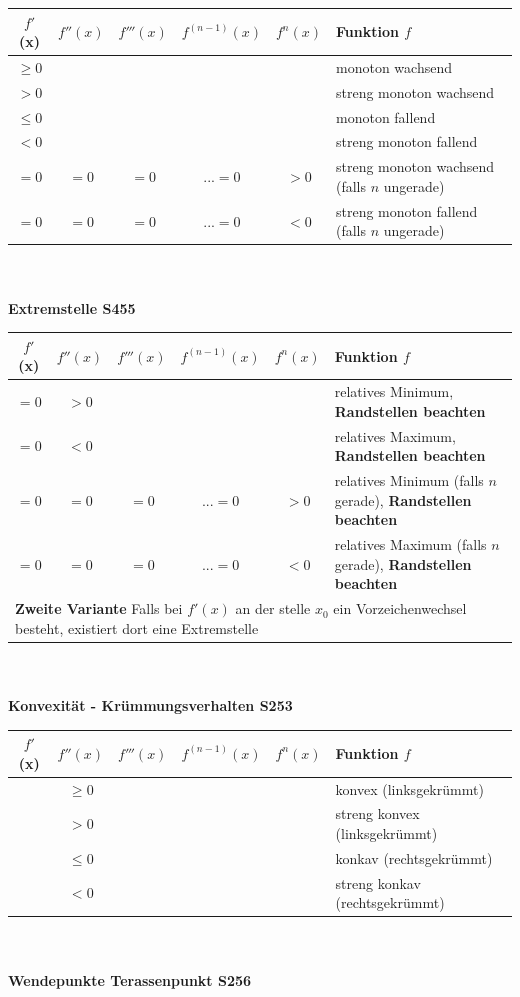 \begin{tabular}{|c|c|c|c|c|l|}
	\hline
	$f'$(x) & $f''(x)$ & $f'''(x)$ & $f^{(n-1)}(x)$ & $f^{n}(x)$ & Funktion $f$\\
	\hline
	$\geq0$ &&&&& monoton wachsend\\
	\hline
	$>0$ &&&&& streng monoton wachsend\\
	\hline
	$\leq0$ &&&&& monoton fallend\\	
	\hline
	$<0$ &&&&& streng monoton fallend\\
	\hline
	$=0$ & $=0$ & $=0$ & $...=0$ & $>0$ & streng monoton wachsend (falls $n$ ungerade)\\
	\hline
	$=0$ & $=0$ & $=0$ & $...=0$ & $<0$ & streng monoton fallend (falls $n$ ungerade)\\
	\hline
\end{tabular}
\\
\\
\textbf{Extremstelle \color{red}S455}

\begin{tabular}{|c|c|c|c|c|l|}
	\hline
	$f'$(x) & $f''(x)$ & $f'''(x)$ & $f^{(n-1)}(x)$ & $f^{n}(x)$ & Funktion $f$\\
	\hline
	$=0$ & $>0$ &&&& relatives Minimum, \textbf{Randstellen beachten}\\
	\hline
	$=0$ & $<0$ &&&& relatives Maximum, \textbf{Randstellen beachten}\\
	\hline
	$=0$ & $=0$ & $=0$ & $...=0$ & $>0$ & relatives Minimum (falls $n$ gerade), \textbf{Randstellen beachten}\\
	\hline
	$=0$ & $=0$ & $=0$ & $...=0$ & $<0$ & relatives Maximum (falls $n$ gerade), \textbf{Randstellen beachten}\\
	\hline
	\multicolumn{6}{|l|}{\textbf{Zweite Variante} Falls bei $f'(x)$ an der stelle $x_{0}$ ein Vorzeichenwechsel besteht, existiert dort eine Extremstelle}\\
	\hline
\end{tabular}
\\
\\
\textbf{Konvexität - Krümmungsverhalten \color{red}S253}

\begin{tabular}{|c|c|c|c|c|l|}
	\hline
	$f'$(x) & $f''(x)$ & $f'''(x)$ & $f^{(n-1)}(x)$ & $f^{n}(x)$ & Funktion $f$\\
	\hline
	& $\geq0$ &&&& konvex (linksgekrümmt)\\
	\hline
	& $>0$ &&&& streng konvex (linksgekrümmt)\\
	\hline
	& $\leq0$ &&&& konkav (rechtsgekrümmt)\\
	\hline
	& $<0$ &&&& streng konkav (rechtsgekrümmt)\\
	\hline
\end{tabular}
\\
\\
\textbf{Wendepunkte Terassenpunkt \color{red}S256}

